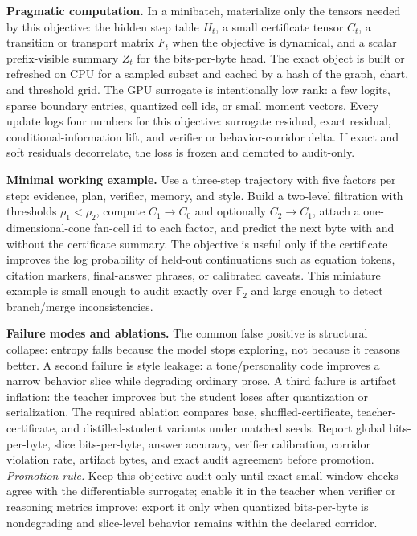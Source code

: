 \documentclass[10pt]{article}
\newcommand{\FF}{\mathbb{F}}
\numberwithin{equation}{section}
\begin{document}
\noindent\textbf{Pragmatic computation.} In a minibatch, materialize only the tensors needed by this objective: the hidden step table $H_t$, a small certificate tensor $C_t$, a transition or transport matrix $F_t$ when the objective is dynamical, and a scalar prefix-visible summary $Z_t$ for the bits-per-byte head. The exact object is built or refreshed on CPU for a sampled subset and cached by a hash of the graph, chart, and threshold grid. The GPU surrogate is intentionally low rank: a few logits, sparse boundary entries, quantized cell ids, or small moment vectors. Every update logs four numbers for this objective: surrogate residual, exact residual, conditional-information lift, and verifier or behavior-corridor delta. If exact and soft residuals decorrelate, the loss is frozen and demoted to audit-only.

\noindent\textbf{Minimal working example.} Use a three-step trajectory with five factors per step: evidence, plan, verifier, memory, and style. Build a two-level filtration with thresholds $\rho_1<\rho_2$, compute $C_1\to C_0$ and optionally $C_2\to C_1$, attach a one-dimensional-cone fan-cell id to each factor, and predict the next byte with and without the certificate summary. The objective is useful only if the certificate improves the log probability of held-out continuations such as equation tokens, citation markers, final-answer phrases, or calibrated caveats. This miniature example is small enough to audit exactly over $\FF_2$ and large enough to detect branch/merge inconsistencies.

\noindent\textbf{Failure modes and ablations.} The common false positive is structural collapse: entropy falls because the model stops exploring, not because it reasons better. A second failure is style leakage: a tone/personality code improves a narrow behavior slice while degrading ordinary prose. A third failure is artifact inflation: the teacher improves but the student loses after quantization or serialization. The required ablation compares base, shuffled-certificate, teacher-certificate, and distilled-student variants under matched seeds. Report global bits-per-byte, slice bits-per-byte, answer accuracy, verifier calibration, corridor violation rate, artifact bytes, and exact audit agreement before promotion.
\vfill
\noindent\emph{Promotion rule.} Keep this objective audit-only until exact small-window checks agree with the differentiable surrogate; enable it in the teacher when verifier or reasoning metrics improve; export it only when quantized bits-per-byte is nondegrading and slice-level behavior remains within the declared corridor.
\clearpage
\end{document}

